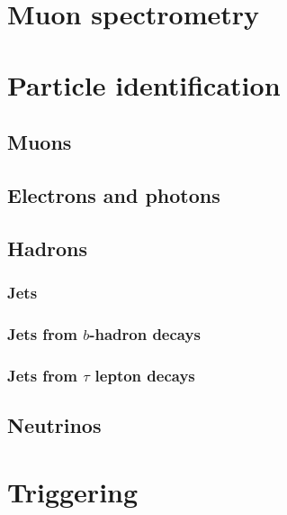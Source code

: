 \section{Muon spectrometry}
\section{Particle identification}
\subsection{Muons}
\subsection{Electrons and photons}
\subsection{Hadrons}
\subsubsection{Jets}
\subsubsection{Jets from $b$-hadron decays}
\subsubsection{Jets from $\tau$ lepton decays}
\subsection{Neutrinos}
\section{Triggering}


